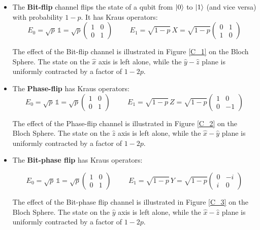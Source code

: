 \begin{itemize}

\item The \textbf{Bit-flip} channel flips the state of a qubit from $\left| 0 \right \rangle$ to $\left| 1 \right \rangle$ (and vice versa) with probability $1-p$. It has Kraus operators:
\begin{equation}
E_0 = \sqrt{p}\, \mathbb{1}= \sqrt{p} \begin{pmatrix} 1 & 0\\  0 & 1 \end{pmatrix} \hspace{1cm} E_1 = \sqrt{1-p}\, X= \sqrt{1-p} \begin{pmatrix} 0 & 1\\  1 & 0 \end{pmatrix}
\label{23_firstchapter}
\end{equation}

The effect of the Bit-flip channel is illustrated in Figure \ref{C_1} on the Bloch Sphere. The state on the $\hat{x}$ axis is left alone, while the $\hat{y}-\hat{z}$ plane is uniformly contracted by a factor of $1-2p$.


\item The \textbf{Phase-flip} has Kraus operators:
\begin{equation}
E_0 = \sqrt{p}\, \mathbb{1}= \sqrt{p} \begin{pmatrix} 1 & 0\\  0 & 1 \end{pmatrix} \hspace{1cm} E_1 = \sqrt{1-p}\, Z= \sqrt{1-p} \begin{pmatrix} 1 & 0\\  0 & -1 \end{pmatrix}
\label{24_firstchapter}
\end{equation}


The effect of the Phase-flip channel is illustrated in Figure \ref{C_2} on the Bloch Sphere. The state on the $\hat{z}$ axis is left alone, while the $\hat{x}-\hat{y}$ plane is uniformly contracted by a factor of $1-2p$.

\item The \textbf{Bit-phase flip} has Kraus operators:

\begin{equation}
E_0 = \sqrt{p}\, \mathbb{1}= \sqrt{p} \begin{pmatrix} 1 & 0\\  0 & 1 \end{pmatrix} \hspace{1cm} E_1 = \sqrt{1-p}\, Y= \sqrt{1-p} \begin{pmatrix} 0 & -i\\  i & 0 \end{pmatrix}
\label{25_firstchapter}
\end{equation}


The effect of the Bit-phase flip channel is illustrated in Figure \ref{C_3} on the Bloch Sphere. The state on the $\hat{y}$ axis is left alone, while the $\hat{x}-\hat{z}$ plane is uniformly contracted by a factor of $1-2p$.
\end{itemize}




